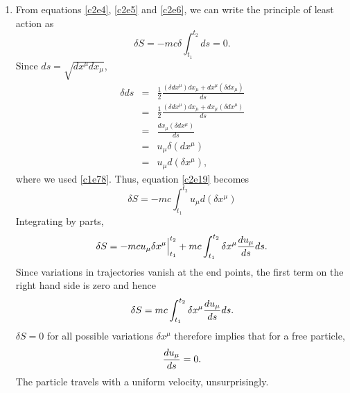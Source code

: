 \begin{enumerate}
\item From equations \eqref{c2e4}, \eqref{c2e5} and \eqref{c2e6}, we can write
the principle of least action as
\begin{equation}\label{c2e19}
\delta S = -mc\delta\int_{t_1}^{t_2} ds = 0.
\end{equation}
Since $ds = \sqrt{dx^\mu dx_\mu}$, 
\begin{eqnarray*}
\delta ds &=& \frac{1}{2}\frac{(\delta dx^\mu)dx_\mu + dx^\mu (\delta dx_\mu)}{ds} \\
 &=& \frac{1}{2}\frac{(\delta dx^\mu)dx_\mu + dx_\mu (\delta dx^\mu)}{ds} \\
 &=& \frac{dx_\mu(\delta dx^\mu)}{ds} \\
 &=& u_\mu \delta(dx^\mu) \\
 &=& u_\mu d(\delta x^\mu),
\end{eqnarray*}
where we used \eqref{c1e78}. Thus, equation \eqref{c2e19} becomes
\begin{equation}\label{c2e20}
\delta S = -mc\int_{t_1}^{t_2}u_\mu d(\delta x^\mu)
\end{equation}
Integrating by parts,
\begin{equation}\label{c2e21}
\delta S = -mc u_\mu \delta x^\mu\Big|_{t_1}^{t_2} + 
mc\int_{t_1}^{t_2}\delta x^\mu \frac{d{u_\mu}}{d{s}}ds.
\end{equation}
Since variations in trajectories vanish at the end points, the first term on the
right hand side is zero and hence
\begin{equation}\label{c2e22}
\delta S = mc\int_{t_1}^{t_2}\delta x^\mu \frac{d{u_\mu}}{d{s}}ds.
\end{equation}
$\delta S = 0$ for all possible variations $\delta x^\mu$ therefore implies that 
for a free particle,
\begin{equation}\label{c2e23}
\frac{d{u_\mu}}{d{s}} = 0.
\end{equation}
The particle travels with a uniform velocity, unsurprisingly.


\end{enumerate}
